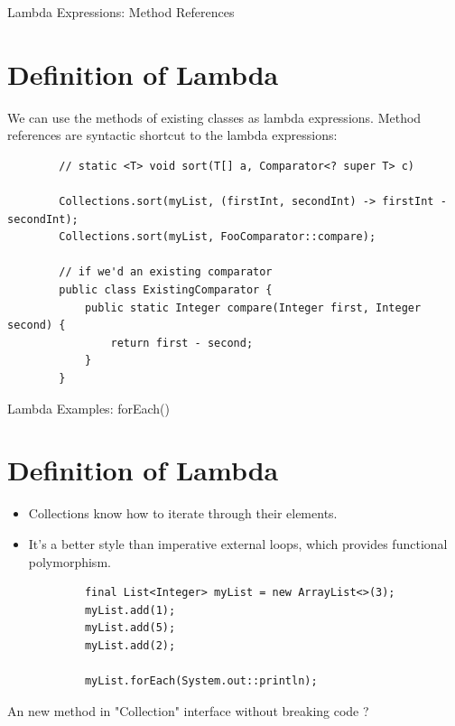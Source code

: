 \documentclass{beamer}
\begin{document}
	\begin{frame}[fragile]{Lambda Expressions: Method References}
		\section{Definition of Lambda}
		We can use the methods of existing classes as lambda expressions.
		Method references are syntactic shortcut to the lambda expressions:
		\begin{lstlisting}
		// static <T> void sort(T[] a, Comparator<? super T> c)
		
		Collections.sort(myList, (firstInt, secondInt) -> firstInt - secondInt);
		Collections.sort(myList, FooComparator::compare);
		
		// if we'd an existing comparator
		public class ExistingComparator {
  			public static Integer compare(Integer first, Integer second) {
    		    return first - second;
  			}
		}
		\end{lstlisting}
		
	\end{frame}	
	
	\begin{frame}[fragile]{Lambda Examples: forEach() }
		\section{Definition of Lambda}
			\begin{itemize}
				\item Collections know how to iterate through their elements.
				\item It's a better style than imperative external loops, which provides functional polymorphism.
			\end{itemize}

			\begin{lstlisting}
    		final List<Integer> myList = new ArrayList<>(3);
    		myList.add(1);
    		myList.add(5);
    		myList.add(2);

    		myList.forEach(System.out::println);
			\end{lstlisting}
			
			An new method in "Collection" interface without breaking code ?
	\end{frame}	
\end{document}
